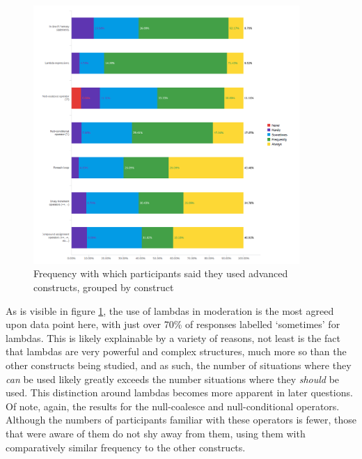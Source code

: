 \documentclass{article}
\begin{document}
            \begin{figure}[htbp]
                \centering
                \includegraphics[width=0.9\textwidth]{freqUse}
                \caption{Frequency with which participants said they used advanced constructs, grouped by construct}
                \label{fig:freqUse}
            \end{figure}

            As is visible in figure \ref{fig:freqUse}, the use of lambdas in moderation is the most agreed upon data point here, with just over 70\% of responses labelled `sometimes' for lambdas. This is likely explainable by a variety of reasons, not least is the fact that lambdas are very powerful and complex structures, much more so than the other constructs being studied, and as such, the number of situations where they \emph{can} be used likely greatly exceeds the number situations where they \emph{should} be used. This distinction around lambdas becomes more apparent in later questions.
            Of note, again, the results for the null-coalesce and null-conditional operators. Although the numbers of participants familiar with these operators is fewer, those that were aware of them do not shy away from them, using them with comparatively similar frequency to the other constructs.
\end{document}
